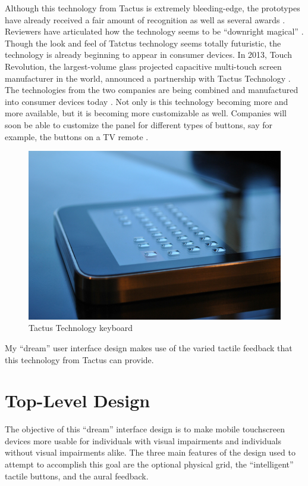 \documentclass[11pt]{article}
\begin{document}
Although this technology from Tactus is extremely bleeding-edge, the prototypes have already received a fair amount of recognition as well as several awards \cite{CNN, I-Zone, PCMag, Wired}. Reviewers have articulated how the technology seems to be ``downright magical'' \cite{CNN}. Though the look and feel of Tatctus technology seems totally futuristic, the technology is already beginning to appear in consumer devices. In 2013, Touch Revolution, the largest-volume glass projected capacitive multi-touch screen manufacturer in the world, announced a partnership with Tactus Technology \cite{TactusAvailability}. The technologies from the two companies are being combined and manufactured into consumer devices today \cite{TactusAvailability}. Not only is this technology becoming more and more available, but it is becoming more customizable as well. Companies will soon be able to customize the panel for different types of buttons, say for example, the buttons on a TV remote \cite{CNN}.

\begin{figure}[ht]
\centering
\includegraphics[width=4.5in]{tactus2.jpg} 
\caption{Tactus Technology keyboard}
\label{tactus1}
\end{figure}

My ``dream'' user interface design makes use of the varied tactile feedback that this technology from Tactus can provide.


\section{Top-Level Design}
The objective of this ``dream'' interface design is to make mobile touchscreen devices more usable for individuals with visual impairments and individuals without visual impairments alike. The three main features of the design used to attempt to accomplish this goal are the optional physical grid, the ``intelligent'' tactile buttons, and the aural feedback. 
\end{document}
